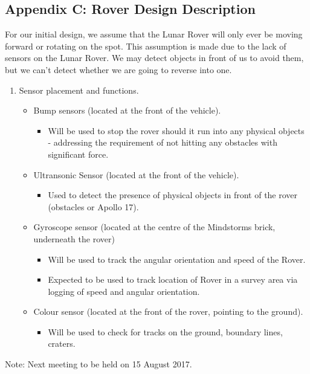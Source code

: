\documentclass[11pt, a4paper]{article}
\begin{document}
\begin{flushleft}
\subsection{Appendix C: Rover Design Description}
For our initial design, we assume that the Lunar Rover will only ever be moving forward or rotating on the spot. This assumption is made due to the lack of sensors on the Lunar Rover. We may detect objects in front of us to avoid them, but we can't detect whether we are going to reverse into one.
\begin{enumerate}
	\item Sensor placement and functions.
    \begin{itemize}
    	\item Bump sensors (located at the front of the vehicle).
        \begin{itemize}
       		\item Will be used to stop the rover should it run into any physical objects - addressing the requirement of not hitting any obstacles with significant force.
        \end{itemize}
        \item Ultransonic Sensor (located at the front of the vehicle).
        \begin{itemize}
        	\item Used to detect the presence of physical objects in front of the rover (obstacles or Apollo 17).
        \end{itemize}
        \item Gyroscope sensor (located at the centre of the Mindstorms brick, underneath the rover)
        \begin{itemize}
        	\item Will be used to track the angular orientation and speed of the Rover.
            \item Expected to be used to track location of Rover in a survey area via logging of speed and angular orientation.
        \end{itemize}
        \item Colour sensor (located at the front of the rover, pointing to the ground).
        \begin{itemize}
        	\item Will be used to check for tracks on the ground, boundary lines, craters.
        \end{itemize}
    \end{itemize}
\end{enumerate}
            
       
\end{flushleft}
  \vspace*{10pt}
  \noindent Note: Next meeting to be held on 15 August 2017.




  
\end{document}
